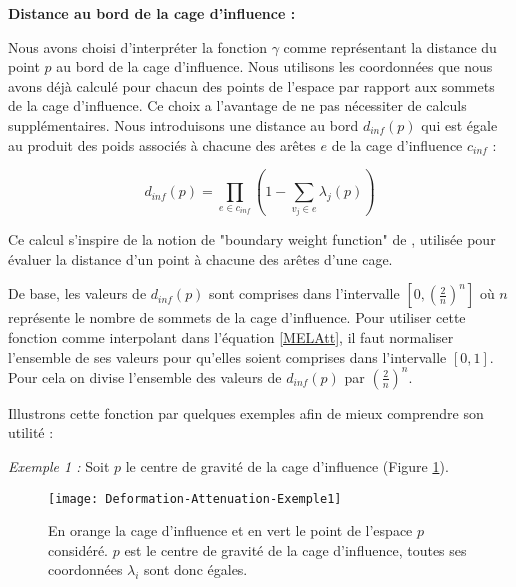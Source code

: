\textbf{Distance au bord de la cage d'influence :}

Nous avons choisi d'interpréter la fonction $\gamma$ comme représentant la
distance du point $p$ au bord de la cage d'influence. Nous utilisons les
coordonnées que nous avons déjà calculé pour chacun des points de l'espace par
rapport aux sommets de la cage d'influence. Ce choix a l'avantage de ne pas
nécessiter de calculs supplémentaires. Nous introduisons une distance au bord
$d_{inf}(p)$ qui est égale au produit des poids associés à chacune des arêtes
$e$ de la cage d'influence $c_{inf}$ :

\begin{equation}
  d_{inf}(p) = \prod_{e \in c_{inf}} (1 - \sum_{v_j \in e} \lambda_j(p))
  \label{MELInf}
\end{equation}

Ce calcul s'inspire de la notion de "boundary weight function" de
\cite{GPCP13}, utilisée pour évaluer la distance d'un point à chacune des
arêtes d'une cage.

De base, les valeurs de $d_{inf}(p)$ sont comprises dans l'intervalle
$[0,(\frac{2}{n})^n]$ où $n$ représente le nombre de sommets de la cage
d'influence. Pour utiliser cette fonction comme interpolant dans l'équation
\ref{MELAtt}, il faut normaliser l'ensemble de ses valeurs pour qu'elles
soient comprises dans l'intervalle $[0,1]$. Pour cela on divise l'ensemble des
valeurs de $d_{inf}(p)$ par $(\frac{2}{n})^n$.

Illustrons cette fonction par quelques exemples afin de mieux comprendre son
utilité :

\textit{Exemple 1 :} Soit $p$ le centre de gravité de la cage d'influence
(Figure \ref{MELEx1}).

\begin{figure}[!ht]
\texttt{[image: Deformation-Attenuation-Exemple1]}

\caption[Atténuation : Exemple 1] {En orange la cage d'influence et en vert
le point de l'espace $p$ considéré. $p$ est le centre de gravité de la cage
d'influence, toutes ses coordonnées $\lambda_i$ sont donc égales.}

\label{MELEx1}
\end{figure}


